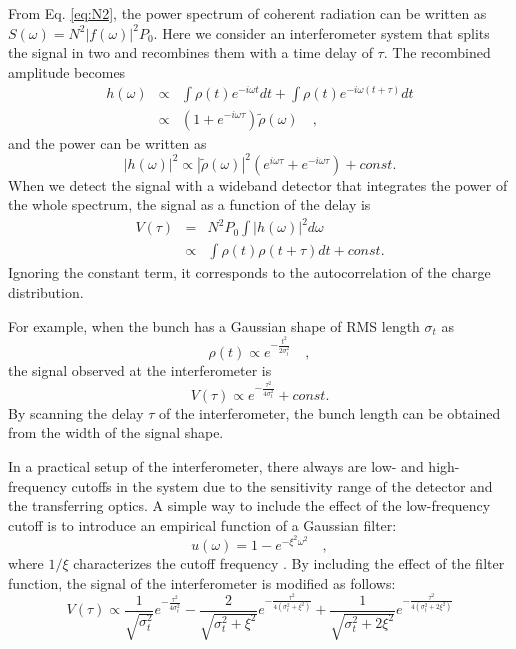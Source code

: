 \documentclass[review]{elsarticle}
\begin{document}
From Eq. \ref{eq:N2}, the power spectrum of coherent radiation 
can be written as
$S(\omega) = N^2 |f(\omega)|^2 P_0 $.
%
Here we consider an interferometer system
that splits the signal in two and recombines them with a time delay of $\tau$.
The recombined amplitude becomes
\begin{eqnarray}
h(\omega) &\propto& \int \rho(t) e^{-i\omega t} dt + \int \rho(t) e^{-i\omega(t+\tau)}dt \\
&\propto& (1+e^{-i\omega \tau}) \tilde{\rho}(\omega) \quad ,
\end{eqnarray}
and the power can be written as
\begin{equation}
|h(\omega)|^2 \propto |\tilde{\rho}(\omega)|^2 (e^{i \omega \tau} + e^{-i \omega \tau}) + const.
\end{equation}
When we detect the signal with a wideband detector
that integrates the power of the whole spectrum,
the signal as a function of the delay is
\begin{eqnarray}
V(\tau) &=& N^2 P_0 \int |h(\omega)|^2 d\omega \\
&\propto& \int \rho(t) \rho(t+\tau) dt + const.
\end{eqnarray}
Ignoring the constant term,
it corresponds to the autocorrelation of the charge distribution.

For example,
when the bunch has a Gaussian shape of RMS length $\sigma_t$ as
\begin{equation}
\rho(t) \propto e^{-\frac{t^2}{2 \sigma_t ^2}} \quad,
\end{equation}
the signal observed at the interferometer is
\begin{equation}
V(\tau) \propto e^{-\frac{\tau^2}{4 \sigma_t ^2}} + const.
\end{equation}
By scanning the delay $\tau$ of the interferometer,
the bunch length can be obtained from the width of the signal shape.


In a practical setup of the interferometer,
there always are
low- and high-frequency cutoffs in the system
due to the 
sensitivity range of the detector and the transferring optics.
A simple way to include the effect of the low-frequency cutoff
is to introduce an empirical function of a Gaussian filter:
\begin{equation}
u(\omega) = 1 - e^{-\xi^2 \omega^2} \quad,
\end{equation}
where $1/\xi$ characterizes the cutoff frequency
\cite{Murokh}\cite{Noz}.
By including the effect of the filter function,
the signal of the interferometer is modified as follows:
\begin{equation}
V(\tau) \propto
\frac{1}{\sqrt{\sigma_t^2}} e^{-\frac{\tau^2}{4 \sigma_t^2}}
- \frac{2}{\sqrt{\sigma_t^2 + \xi^2}} e^{-\frac{\tau^2}{4(\sigma_t^2 + \xi^2)}}
+ \frac{1}{\sqrt{\sigma_t^2 + 2 \xi^2}} e^{-\frac{\tau^2}{4(\sigma_t^2 + 2 \xi^2)}}
\end{equation}
\end{document}

